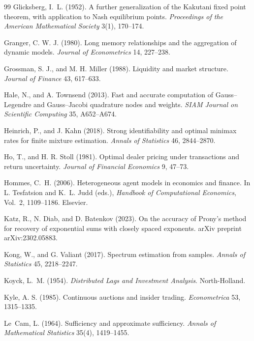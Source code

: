 \documentclass[12pt]{article}
\theoremstyle{definition}
\theoremstyle{remark}
\begin{document}
\begin{thebibliography}{99}
 Glicksberg, I.~L. (1952). A further generalization of the Kakutani fixed point theorem, with application to Nash equilibrium points. \emph{Proceedings of the American Mathematical Society} 3(1), 170--174.

 Granger, C. W. J. (1980). Long memory relationships and the aggregation of dynamic models. \emph{Journal of Econometrics} 14, 227--238.

 Grossman, S. J., and M. H. Miller (1988). Liquidity and market structure. \emph{Journal of Finance} 43, 617--633.

 Hale, N., and A. Townsend (2013). Fast and accurate computation of Gauss--Legendre and Gauss--Jacobi quadrature nodes and weights. \emph{SIAM Journal on Scientific Computing} 35, A652--A674.

 Heinrich, P., and J. Kahn (2018). Strong identifiability and optimal minimax rates for finite mixture estimation. \emph{Annals of Statistics} 46, 2844--2870.

 Ho, T., and H. R. Stoll (1981). Optimal dealer pricing under transactions and return uncertainty. \emph{Journal of Financial Economics} 9, 47--73.

 Hommes, C.~H. (2006). Heterogeneous agent models in economics and finance. In L. Tesfatsion and K.~L. Judd (eds.), \emph{Handbook of Computational Economics}, Vol.~2, 1109--1186. Elsevier.

 Katz, R., N. Diab, and D. Batenkov (2023). On the accuracy of Prony's method for recovery of exponential sums with closely spaced exponents. arXiv preprint arXiv:2302.05883.

 Kong, W., and G. Valiant (2017). Spectrum estimation from samples. \emph{Annals of Statistics} 45, 2218--2247.

 Koyck, L.~M. (1954). \emph{Distributed Lags and Investment Analysis}. North-Holland.

 Kyle, A. S. (1985). Continuous auctions and insider trading. \emph{Econometrica} 53, 1315--1335.

 Le~Cam, L. (1964). Sufficiency and approximate sufficiency. \emph{Annals of Mathematical Statistics} 35(4), 1419--1455.


\end{thebibliography}
\end{document}

